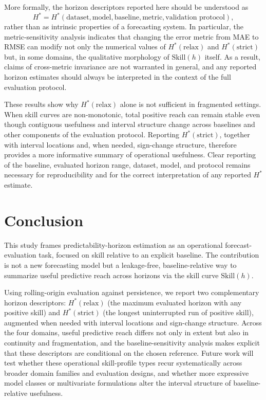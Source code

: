 \documentclass[pdflatex]{sn-jnl}
\begin{document}
More formally, the horizon descriptors reported here should be understood as
\[
H^* = H^*(\text{dataset}, \text{model}, \text{baseline}, \text{metric}, \text{validation protocol}),
\]
rather than as intrinsic properties of a forecasting system. In particular, the metric-sensitivity analysis indicates that changing the error metric from MAE to RMSE can modify not only the numerical values of $H^*(\mathrm{relax})$ and $H^*(\mathrm{strict})$ but, in some domains, the qualitative morphology of $\mathrm{Skill}(h)$ itself. As a result, claims of cross-metric invariance are not warranted in general, and any reported horizon estimates should always be interpreted in the context of the full evaluation protocol.

These results show why $H^*(\mathrm{relax})$ alone is not sufficient in
fragmented settings. When skill curves are non-monotonic, total positive
reach can remain stable even though contiguous usefulness and interval
structure change across baselines and other components of the evaluation protocol. Reporting $H^*(\mathrm{strict})$,
together with interval locations and, when needed, sign-change
structure, therefore provides a more informative summary of operational
usefulness. Clear reporting of the baseline, evaluated horizon range,
dataset, model, and protocol remains necessary for reproducibility and
for the correct interpretation of any reported $H^*$ estimate.


\section{Conclusion}

This study frames predictability-horizon estimation as an operational
forecast-evaluation task, focused on skill relative to an explicit
baseline. The contribution is not a new forecasting model but a
leakage-free, baseline-relative way to summarize useful predictive reach
across horizons via the skill curve $\mathrm{Skill}(h)$.

Using rolling-origin evaluation against persistence, we report two
complementary horizon descriptors: $H^*(\mathrm{relax})$ (the maximum
evaluated horizon with any positive skill) and $H^*(\mathrm{strict})$
(the longest uninterrupted run of positive skill), augmented when needed
with interval locations and sign-change structure. Across the four
domains, useful predictive reach differs not only in extent but also in
continuity and fragmentation, and the baseline-sensitivity analysis makes
explicit that these descriptors are conditional on the chosen reference.
Future work will test whether these
operational skill-profile types recur systematically across broader
domain families and evaluation designs, and whether more expressive model
classes or multivariate formulations alter the interval structure of
baseline-relative usefulness.
\end{document}
